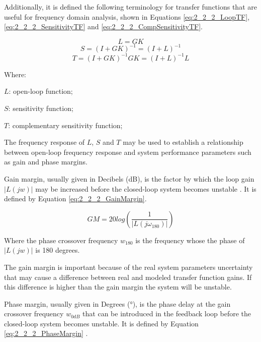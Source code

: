 Additionally, it is defined the following terminology for transfer functions that are useful for frequency domain analysis, shown in Equations \ref{eq:2_2_2_LoopTF}, \ref{eq:2_2_2_SensitivityTF} and \ref{eq:2_2_2_CompSensitivityTF}.

\begin{equation}
\label{eq:2_2_2_LoopTF}
L = GK
\end{equation}
\begin{equation}
\label{eq:2_2_2_SensitivityTF}
S = (I + GK)^{-1} = (I + L)^{-1}
\end{equation}
\begin{equation}
\label{eq:2_2_2_CompSensitivityTF}
T = (I + GK)^{-1}GK = (I + L)^{-1}L
\end{equation}

Where:

\begin{description}
	\item \hspace{20pt}$L$: open-loop function;
	\item \hspace{20pt}$S$: sensitivity function;
	\item \hspace{20pt}$T$: complementary sensitivity function;
\end{description}

The frequency response of $L$, $S$ and $T$ may be used to establish a relationship between open-loop frequency response and system performance parameters such as gain and phase margins.

Gain margin, usually given in Decibels (dB), is the factor by which the loop gain $|L(jw)|$ may be increased before the closed-loop system becomes unstable \cite{Skogestad}. It is defined by Equation \ref{eq:2_2_2_GainMargin}.

\begin{equation}
\label{eq:2_2_2_GainMargin}
GM = 20log\left(\frac{1}{|L(j\omega_{180})|}\right)
\end{equation}

Where the phase crossover frequency $w_{180}$ is the frequency whose the phase of $|L(jw)|$ is 180 degrees.

The gain margin is important because of the real system parameters uncertainty that may cause a difference between real and modeled transfer function gains. If this difference is higher than the gain margin the system will be unstable.

Phase margin, usually given in Degrees ($°$), is the phase delay at the gain crossover frequency $w_{0dB}$ that can be introduced in the feedback loop before the closed-loop system becomes unstable. It is defined by Equation \ref{eq:2_2_2_PhaseMargin} \cite{Skogestad}.

